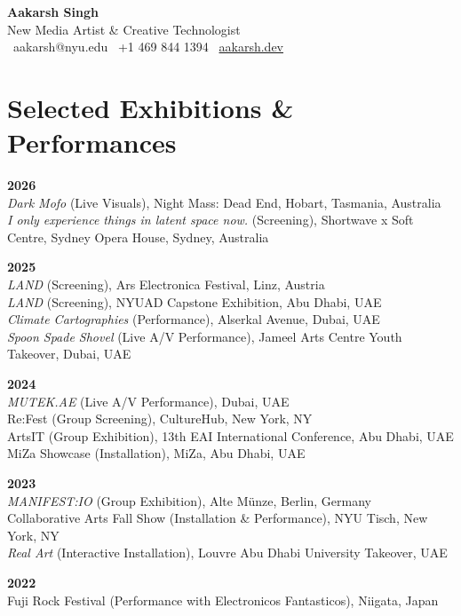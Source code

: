 \documentclass[11pt,a4paper]{article}
\begin{document}
\begin{center}
    {\LARGE\textbf{Aakarsh Singh}}\\[0.3em]
    {\large New Media Artist \& Creative Technologist}\\[0.8em]
    \faEnvelope\ aakarsh@nyu.edu \quad
    \faPhone\ +1 469 844 1394 \quad
    \faGlobe\ \href{https://aakarsh.dev}{aakarsh.dev}
\end{center}

\section*{Selected Exhibitions \& Performances}

\textbf{2026}\\
\textit{Dark Mofo} (Live Visuals), Night Mass: Dead End, Hobart, Tasmania, Australia\\
\textit{I only experience things in latent space now.} (Screening), Shortwave x Soft Centre, Sydney Opera House, Sydney, Australia

\textbf{2025}\\
\textit{LAND} (Screening), Ars Electronica Festival, Linz, Austria\\
\textit{LAND} (Screening), NYUAD Capstone Exhibition, Abu Dhabi, UAE\\
\textit{Climate Cartographies} (Performance), Alserkal Avenue, Dubai, UAE\\
\textit{Spoon Spade Shovel} (Live A/V Performance), Jameel Arts Centre Youth Takeover, Dubai, UAE

\textbf{2024}\\
\textit{MUTEK.AE} (Live A/V Performance), Dubai, UAE\\
Re:Fest (Group Screening), CultureHub, New York, NY\\
ArtsIT (Group Exhibition), 13th EAI International Conference, Abu Dhabi, UAE\\
MiZa Showcase (Installation), MiZa, Abu Dhabi, UAE

\textbf{2023}\\
\textit{MANIFEST:IO} (Group Exhibition), Alte M\"{u}nze, Berlin, Germany\\
Collaborative Arts Fall Show (Installation \& Performance), NYU Tisch, New York, NY\\
\textit{Real Art} (Interactive Installation), Louvre Abu Dhabi University Takeover, UAE

\textbf{2022}\\
Fuji Rock Festival (Performance with Electronicos Fantasticos), Niigata, Japan
\end{document}
